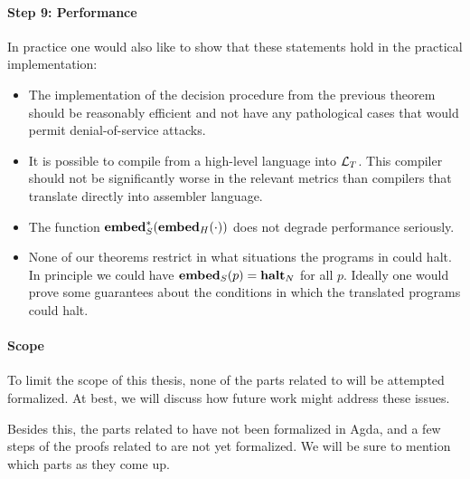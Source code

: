 \paragraph{Step 9: Performance} In practice one would also like to show that
these statements hold in the practical implementation:

\begin{itemize}
\item The implementation of the decision procedure from the previous theorem
  should be reasonably efficient and not have any pathological cases that would
  permit denial-of-service attacks.
\item It is possible to compile from a high-level language into
  $\mathcal{L}_T$. This compiler should not be significantly worse in the relevant
  metrics than compilers that translate directly into assembler language.
\item The function ${\mathbf{embed}^\ast_S}({{\mathbf{embed}}_H}(\cdot))$ does not degrade
  performance seriously.
\item None of our theorems restrict in what situations the programs in
  \nativelang could halt. In principle we could have
  ${{\mathbf{embed}}_S}(p) = {\mathbf{halt}_N}$ for all $p$. Ideally one would prove some
  guarantees about the conditions in which the translated programs could halt.
\end{itemize}

\paragraph{Scope} To limit the scope of this thesis, none of the
parts related to \nativelang will be attempted formalized. At best, we will
discuss how future work might address these issues.

Besides this, the parts related to \simplelang have not been formalized in Agda,
and a few steps of the proofs related to \highlang are not yet formalized. We
will be sure to mention which parts as they come up.
